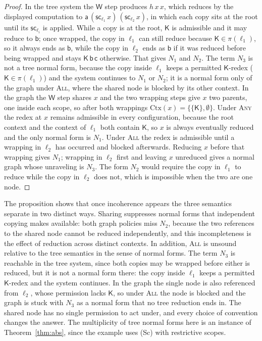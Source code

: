 \documentclass[11pt]{article}
\theoremstyle{definition}
\theoremstyle{remark}
\newcommand{\cK}{\mathsf{K}}
\newcommand{\cW}{\mathsf{W}}
\newcommand{\sca}[1]{\mathsf{sc}_{#1}}
\newcommand{\Ctx}{\mathrm{Ctx}}
\begin{document}
\begin{proof}
In the tree system the $\cW$ step produces $h\,x\,x$, which reduces by the displayed computation to $\mathsf a\,(\sca{\ell_1}\,x)\,(\sca{\ell_2}\,x)$, in which each copy sits at the root until its $\sca{\ell_i}$ is applied. While a copy is at the root, $\cK$ is admissible and it may reduce to $\mathsf b$; once wrapped, the copy in $\ell_1$ can still reduce because $\cK\in\pi(\ell_1)$, so it always ends as $\mathsf b$, while the copy in $\ell_2$ ends as $\mathsf b$ if it was reduced before being wrapped and stays $\cK\,\mathsf b\,\mathsf c$ otherwise. That gives $N_1$ and $N_2$. The term $N_3$ is not a tree normal form, because the copy inside $\ell_1$ keeps a permitted $\cK$-redex ($\cK\in\pi(\ell_1)$) and the system continues to $N_1$ or $N_2$; it is a normal form only of the graph under \textsc{All}, where the shared node is blocked by its other context. In the graph the $\cW$ step shares $x$ and the two wrapping steps give $x$ two parents, one inside each scope, so after both wrappings $\Ctx(x)=\{\{\cK\},\emptyset\}$. Under \textsc{Any} the redex at $x$ remains admissible in every configuration, because the root context and the context of $\ell_1$ both contain $\cK$, so $x$ is always eventually reduced and the only normal form is $N_1$. Under \textsc{All} the redex is admissible until a wrapping in $\ell_2$ has occurred and blocked afterwards. Reducing $x$ before that wrapping gives $N_1$; wrapping in $\ell_2$ first and leaving $x$ unreduced gives a normal graph whose unraveling is $N_3$. The form $N_2$ would require the copy in $\ell_1$ to reduce while the copy in $\ell_2$ does not, which is impossible when the two are one node.
\end{proof}

The proposition shows that once incoherence appears the three semantics separate in two distinct ways. Sharing suppresses normal forms that independent copying makes available: both graph policies miss $N_2$, because the two references to the shared node cannot be reduced independently, and this incompleteness is the effect of reduction across distinct contexts. In addition, \textsc{All} is unsound relative to the tree semantics in the sense of normal forms. The term $N_3$ is reachable in the tree system, since both copies may be wrapped before either is reduced, but it is not a normal form there: the copy inside $\ell_1$ keeps a permitted $\cK$-redex and the system continues. In the graph the single node is also referenced from $\ell_2$, whose permission lacks $\cK$, so under \textsc{All} the node is blocked and the graph is stuck with $N_3$ as a normal form that no tree reduction ends in. The shared node has no single permission to act under, and every choice of convention changes the answer. The multiplicity of tree normal forms here is an instance of Theorem~\ref{thm:abs}, since the example uses (Sc) with restrictive scopes.
\end{document}
